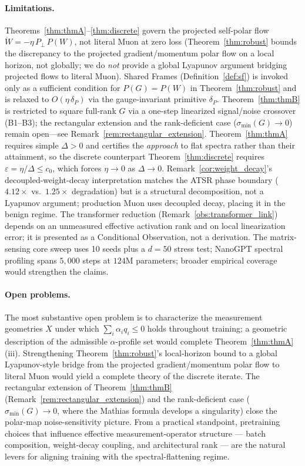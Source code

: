 \documentclass{article}
\begin{document}
\paragraph{Limitations.}
Theorems~\ref{thm:thmA}--\ref{thm:discrete} govern the projected self-polar flow $\dot W=-\eta\,P_\perp\,P(W)$, not literal Muon at zero loss (Theorem~\ref{thm:robust} bounds the discrepancy to the projected gradient/momentum polar flow on a local horizon, not globally; we do \emph{not} provide a global Lyapunov argument bridging projected flows to literal Muon). Shared Frames (Definition~\ref{def:sf}) is invoked only as a sufficient condition for $P(G)=P(W)$ in Theorem~\ref{thm:robust} and is relaxed to $O(\eta\,\delta_P)$ via the gauge-invariant primitive $\delta_P$. Theorem~\ref{thm:thmB} is restricted to square full-rank $G$ via a one-step linearized signal/noise crossover (B1--B3); the rectangular extension and the rank-deficient case ($\sigma_{\min}(G)\to 0$) remain open---see Remark~\ref{rem:rectangular_extension}. Theorem~\ref{thm:thmA} requires simple $\Delta>0$ and certifies the \emph{approach} to flat spectra rather than their attainment, so the discrete counterpart Theorem~\ref{thm:discrete} requires $\varepsilon=\eta/\Delta\leq c_0$, which forces $\eta\to 0$ as $\Delta\to 0$. Remark~\ref{cor:weight_decay}'s decoupled-weight-decay interpretation matches the ATSR phase boundary ($4.12\times$ vs.\ $1.25\times$ degradation) but is a structural decomposition, not a Lyapunov argument; production Muon \citep{liu2025moonlight,jordan2024muon} uses decoupled decay, placing it in the benign regime. The transformer reduction (Remark~\ref{obs:transformer_link}) depends on an unmeasured effective activation rank and on local linearization error; it is presented as a Conditional Observation, not a derivation. The matrix-sensing core sweep uses 10 seeds plus a $d=50$ stress test; NanoGPT spectral profiling spans $5{,}000$ steps at $124$M parameters; broader empirical coverage would strengthen the claims.

\paragraph{Open problems.}
The most substantive open problem is to characterize the measurement geometries $X$ under which $\sum_i\alpha_i q_i \leq 0$ holds throughout training; a geometric description of the admissible $\alpha$-profile set would complete Theorem~\ref{thm:thmA}(iii). Strengthening Theorem~\ref{thm:robust}'s local-horizon bound to a global Lyapunov-style bridge from the projected gradient/momentum polar flow to literal Muon would yield a complete theory of the discrete iterate. The rectangular extension of Theorem~\ref{thm:thmB} (Remark~\ref{rem:rectangular_extension}) and the rank-deficient case ($\sigma_{\min}(G)\to 0$, where the Mathias formula develops a singularity) close the polar-map noise-sensitivity picture. From a practical standpoint, pretraining choices that influence effective measurement-operator structure --- batch composition, weight-decay coupling, and architectural rank --- are the natural levers for aligning training with the spectral-flattening regime.
\end{document}

